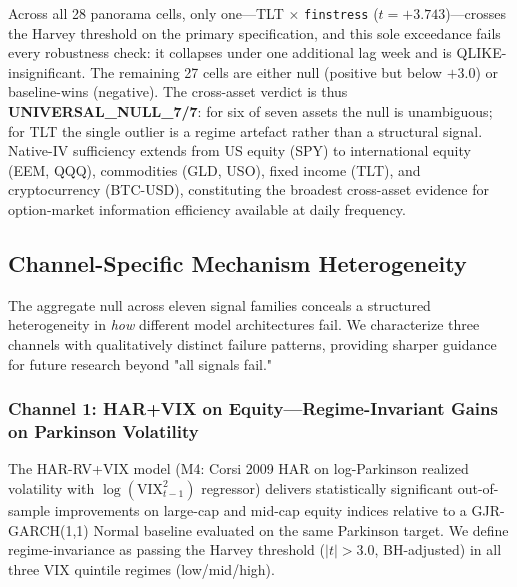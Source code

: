 \documentclass[12pt,a4paper]{article}
\begin{document}
Across all 28 panorama cells, only one---TLT $\times$ \texttt{finstress} ($t = +3.743$)---crosses the Harvey threshold on the primary specification, and this sole exceedance fails every robustness check: it collapses under one additional lag week and is QLIKE-insignificant. The remaining 27 cells are either null (positive but below $+3.0$) or baseline-wins (negative). The cross-asset verdict is thus \textbf{UNIVERSAL\_NULL\_7/7}: for six of seven assets the null is unambiguous; for TLT the single outlier is a regime artefact rather than a structural signal. Native-IV sufficiency extends from US equity (SPY) to international equity (EEM, QQQ), commodities (GLD, USO), fixed income (TLT), and cryptocurrency (BTC-USD), constituting the broadest cross-asset evidence for option-market information efficiency available at daily frequency.

\subsection{Channel-Specific Mechanism Heterogeneity}
\label{subsec:channel_specific}


The aggregate null across eleven signal families conceals a structured heterogeneity in \emph{how} different model architectures fail. We characterize three channels with qualitatively distinct failure patterns, providing sharper guidance for future research beyond "all signals fail."

\subsubsection{Channel 1: HAR+VIX on Equity---Regime-Invariant Gains on Parkinson Volatility}

The HAR-RV+VIX model (M4: Corsi 2009 HAR on log-Parkinson realized volatility with $\log(\text{VIX}^2_{t-1})$ regressor) delivers statistically significant out-of-sample improvements on large-cap and mid-cap equity indices relative to a GJR-GARCH(1,1) Normal baseline evaluated on the same Parkinson target. We define regime-invariance as passing the Harvey threshold ($|t|>3.0$, BH-adjusted) in all three VIX quintile regimes (low/mid/high).
\end{document}
